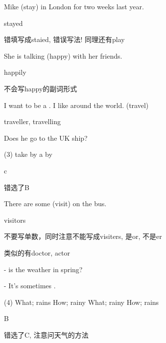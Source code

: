 \begin{question}[tags={xiaoxuect}]
Mike \blank[width=1.4cm]{}(stay) in London for two weeks last year.
\end{question}
\begin{solution}
stayed

错填写成staied, 错误写法! 同理还有play
\end{solution}

\begin{question}[tags={xiaoxuect}]
She is talking \blank[width=1.4cm]{}(happy) with her friends.
\end{question}
\begin{solution}
happily

不会写happy的副词形式
\end{solution}

\begin{question}[tags={xiaoxuect}]
I want to be a \blank[width=1.4cm]{}. I like \blank[width=1.4cm]{} around the world. (travel)
\end{question}
\begin{solution}
traveller, travelling
\end{solution}

\begin{question}[tags={xiaoxuect}]
Does he go to the UK \blank[width=1.4cm]{} ship?

  \begin{tasks}(3)
    \task take
    \task by a
    \task by
  \end{tasks}

\end{question}
\begin{solution}
c

错选了B
\end{solution}

\begin{question}[tags={xiaoxuect}]
There are some \blank[width=1.4cm]{} (visit) on the bus.
\end{question}
\begin{solution}
visitors

不要写单数，同时注意不能写成visiters, 是or, 不是er

类似的有doctor, actor
\end{solution}

\begin{question}[tags={xiaoxuect}]
- \blank*[width=1.4cm]{} is the weather in spring?

\noindent- It's sometimes \blank[width=1.4cm]{}.

  \begin{tasks}(4)
    \task What; rains
    \task How; rainy
    \task What; rainy
    \task How; rains
  \end{tasks}

\end{question}
\begin{solution}
B

错选了C, 注意问天气的方法
\end{solution}


